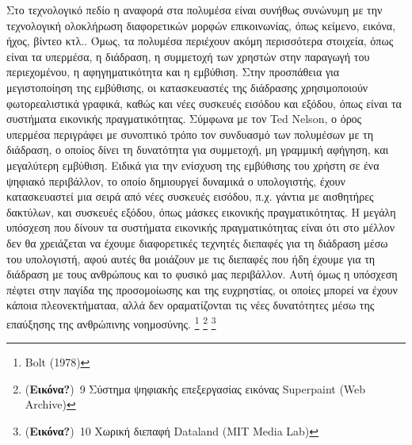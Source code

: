 \documentclass[
]{article}
\begin{document}
Στο τεχνολογικό πεδίο η αναφορά στα πολυμέσα είναι συνήθως συνώνυμη με
την τεχνολογική ολοκλήρωση διαφορετικών μορφών επικοινωνίας, όπως
κείμενο, εικόνα, ήχος, βίντεο κτλ.. Όμως, τα πολυμέσα περιέχουν ακόμη
περισσότερα στοιχεία, όπως είναι τα υπερμέσα, η διάδραση, η συμμετοχή
των χρηστών στην παραγωγή του περιεχομένου, η αφηγηματικότητα και η
εμβύθιση. Στην προσπάθεια για μεγιστοποίηση της εμβύθισης, οι
κατασκευαστές της διάδρασης χρησιμοποιούν φωτορεαλιστικά γραφικά, καθώς
και νέες συσκευές εισόδου και εξόδου, όπως είναι τα συστήματα εικονικής
πραγματικότητας. Σύμφωνα με τον Ted Nelson, ο όρος υπερμέσα περιγράφει
με συνοπτικό τρόπο τον συνδυασμό των πολυμέσων με τη διάδραση, ο οποίος
δίνει τη δυνατότητα για συμμετοχή, μη γραμμική αφήγηση, και μεγαλύτερη
εμβύθιση. Ειδικά για την ενίσχυση της εμβύθισης του χρήστη σε ένα
ψηφιακό περιβάλλον, το οποίο δημιουργεί δυναμικά ο υπολογιστής, έχουν
κατασκευαστεί μια σειρά από νέες συσκευές εισόδου, π.χ. γάντια με
αισθητήρες δακτύλων, και συσκευές εξόδου, όπως μάσκες εικονικής
πραγματικότητας. Η μεγάλη υπόσχεση που δίνουν τα συστήματα εικονικής
πραγματικότητας είναι ότι στο μέλλον δεν θα χρειάζεται να έχουμε
διαφορετικές τεχνητές διεπαφές για τη διάδραση μέσω του υπολογιστή, αφού
αυτές θα μοιάζουν με τις διεπαφές που ήδη έχουμε για τη διάδραση με τους
ανθρώπους και το φυσικό μας περιβάλλον. Αυτή όμως η υπόσχεση πέφτει στην
παγίδα της προσομοίωσης και της ευχρηστίας, οι οποίες μπορεί να έχουν
κάποια πλεονεκτήματαα, αλλά δεν οραματίζονται τις νέες δυνατότητες μέσω
της επαύξησης της ανθρώπινης νοημοσύνης. \footnote{Bolt (1978)}
\footnote{(\textbf{Εικόνα?})~9 Σύστημα ψηφιακής επεξεργασίας εικόνας
  Superpaint (Web Archive)} \footnote{(\textbf{Εικόνα?})~10 Χωρική
  διεπαφή Dataland (MIT Media Lab)}
\end{document}
